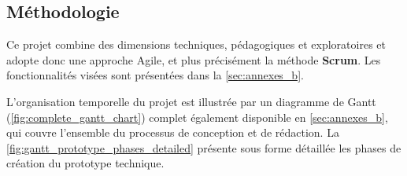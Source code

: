 \subsection{Méthodologie} \label{sec:méthodologie}

Ce projet combine des dimensions techniques, pédagogiques et exploratoires et adopte donc une approche Agile, et plus précisément la méthode \textbf{Scrum}.  
Les fonctionnalités visées sont présentées dans la \autoref{sec:annexes_b}.

L'organisation temporelle du projet est illustrée par un diagramme de Gantt (\autoref{fig:complete_gantt_chart}) complet également disponible en \autoref{sec:annexes_b}, qui couvre l’ensemble du processus de conception et de rédaction.
La \autoref{fig:gantt_prototype_phases_detailed} présente sous forme détaillée les phases de création du prototype technique.

